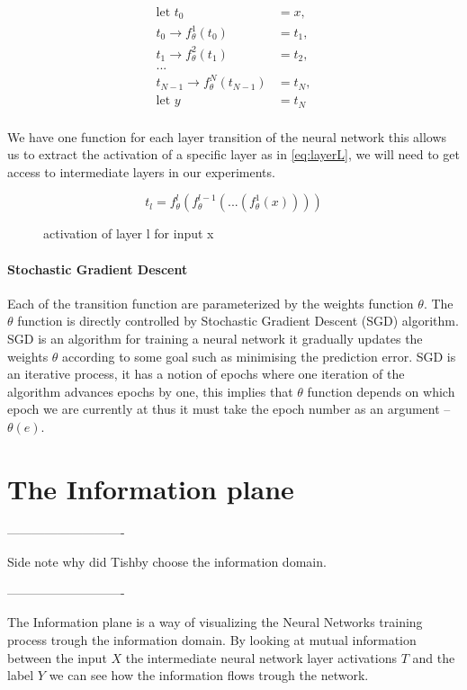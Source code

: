 \begin{align*}
  \text{let } t_0 &= x, \\
    t_0 \rightarrow f_{\theta}^1(t_0) &= t_1,\\
    t_1 \rightarrow f_{\theta}^2(t_1) &= t_2,\\
    ...\\
    t_{N-1} \rightarrow f_{\theta}^N(t_{N-1}) &= t_N,\\
    \text{let } y &= t_N\\
\end{align*}

We have one function for each layer transition of the neural network this allows
us to extract the activation of a specific layer as in \autoref{eq:layerL}, we
will need to get access to intermediate layers in our experiments.

\begin{figure}[H]
  \[ t_l = f_{\theta}^l(f_{\theta}^{l-1}(...(f_{\theta}^1(x)))) \]
  \caption{activation of layer l for input x}
  \label{eq:layerL}
\end{figure}

\paragraph{Stochastic Gradient Descent} Each of the transition function are
parameterized by the weights function $\theta$. The $\theta$ function is
directly controlled by Stochastic Gradient Descent (SGD) algorithm.  SGD is an
algorithm for training a neural network it gradually updates the weights
$\theta$ according to some goal such as minimising the prediction error.  SGD is
an iterative process, it has a notion of epochs where one iteration of the
algorithm advances epochs by one, this implies that $\theta$ function depends on
which epoch we are currently at thus it must take the epoch number as an
argument -- $\theta(e)$.

\section{The Information plane}

----------------------------

Side note why did Tishby choose the information domain.

----------------------------

The Information plane is a way of visualizing the Neural Networks training
process trough the information domain. By looking at mutual information between
the input $X$ the intermediate neural network layer activations $T$ and the
label $Y$ we can see how the information flows trough the network.


